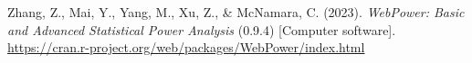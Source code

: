 \documentclass[authordate, meta]{jote-new-article}
\begin{document}
	Zhang, Z., Mai, Y., Yang, M., Xu, Z., \& McNamara, C. (2023). \emph{WebPower: Basic and Advanced Statistical Power Analysis} (0.9.4) [Computer software]. \url{https://cran.r-project.org/web/packages/WebPower/index.html}



    







	

    \clearpage



	






    \clearpage



	





    \clearpage











	









    \clearpage








	
\end{document}
